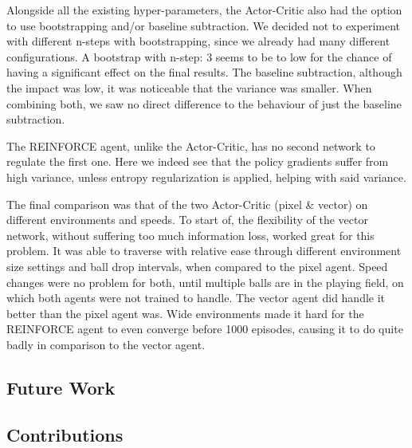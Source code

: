 \documentclass{article}
\begin{document}
    Alongside all the existing hyper-parameters, the Actor-Critic also had the option to use bootstrapping and/or baseline subtraction. 
    We decided not to experiment with different n-steps with bootstrapping, since we already had many different configurations. 
    A bootstrap with n-step: 3 seems to be to low for the chance of having a significant effect on the final results. 
    The baseline subtraction, although the impact was low, it was noticeable that the variance was smaller. 
    When combining both, we saw no direct difference to the behaviour of just the baseline subtraction. 
    
    The REINFORCE agent, unlike the Actor-Critic, has no second network to regulate the first one. 
    Here we indeed see that the policy gradients suffer from high variance, unless entropy regularization is applied, helping with said variance. 
    
    The final comparison was that of the two Actor-Critic (pixel \& vector) on different environments and speeds.
    To start of, the flexibility of the vector network, without suffering too much information loss, worked great for this problem. 
    It was able to traverse with relative ease through different environment size settings and ball drop intervals, when compared to the pixel agent.
    Speed changes were no problem for both, until multiple balls are in the playing field, on which both agents were not trained to handle. 
    The vector agent did handle it better than the pixel agent was. 
    Wide environments made it hard for the REINFORCE agent to even converge before 1000 episodes, causing it to do quite badly in comparison to the vector agent. 
    
    
    \subsection{Future Work}
    
    \subsection{Contributions}
    \label{C-Contributes}
    
    
    
    
    
    
    
    
    
\end{document}
